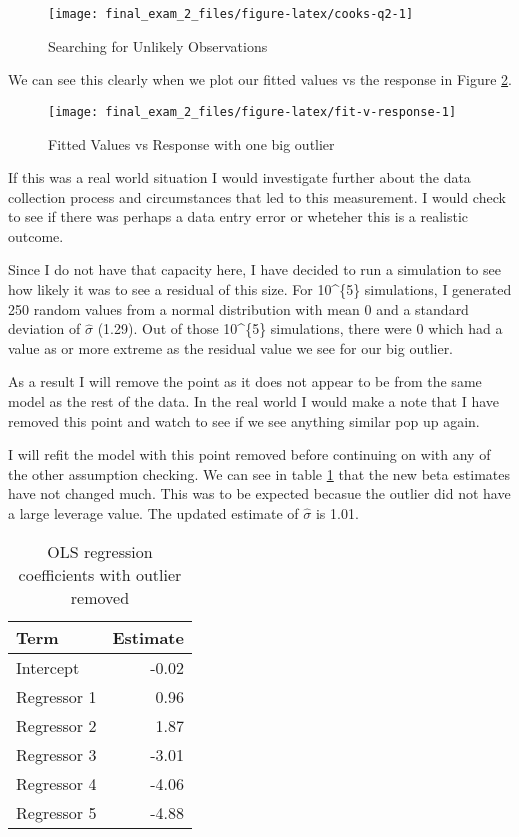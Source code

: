 \documentclass[]{book}
\begin{document}
\begin{figure}

{\centering \texttt{[image: final\_exam\_2\_files/figure-latex/cooks-q2-1]} 

}

\caption{Searching for Unlikely Observations}\label{fig:cooks-q2}
\end{figure}

We can see this clearly when we plot our fitted values vs the response in Figure \ref{fig:fit-v-response}.

\begin{figure}

{\centering \texttt{[image: final\_exam\_2\_files/figure-latex/fit-v-response-1]} 

}

\caption{Fitted Values vs Response with one big outlier}\label{fig:fit-v-response}
\end{figure}

If this was a real world situation I would investigate further about the data collection process and circumstances that led to this measurement. I would check to see if there was perhaps a data entry error or wheteher this is a realistic outcome.

Since I do not have that capacity here, I have decided to run a simulation to see how likely it was to see a residual of this size. For 10\^{}\{5\} simulations, I generated 250 random values from a normal distribution with mean 0 and a standard deviation of \(\hat{\sigma}\) (1.29). Out of those 10\^{}\{5\} simulations, there were 0 which had a value as or more extreme as the residual value we see for our big outlier.

As a result I will remove the point as it does not appear to be from the same model as the rest of the data. In the real world I would make a note that I have removed this point and watch to see if we see anything similar pop up again.

I will refit the model with this point removed before continuing on with any of the other assumption checking. We can see in table \ref{tab:coefs-no-outlier} that the new beta estimates have not changed much. This was to be expected becasue the outlier did not have a large leverage value. The updated estimate of \(\hat{\sigma}\) is 1.01.

\begin{table}

\caption{\label{tab:coefs-no-outlier}OLS regression coefficients with outlier removed}
\centering
\begin{tabular}[t]{lr}
\toprule
Term & Estimate\\
\midrule
Intercept & -0.02\\
Regressor 1 & 0.96\\
Regressor 2 & 1.87\\
Regressor 3 & -3.01\\
Regressor 4 & -4.06\\
Regressor 5 & -4.88\\
\bottomrule
\end{tabular}
\end{table}
\end{document}
